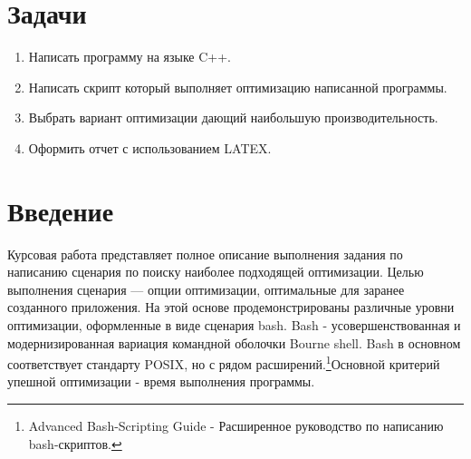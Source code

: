 \documentclass{article}
\begin{document}
\section{Задачи}
 \begin{enumerate}
    \item Написать программу на языке C++.
    \item Написать скрипт который выполняет оптимизацию написанной программы.
    \item Выбрать вариант оптимизации дающий наибольшую производительность.
    \item Оформить отчет с использованием LATEX.
  \end{enumerate}
  
\newpage 
\section{Введение}
\setlength{\parindent}{1.25cm}Курсовая работа представляет полное описание выполнения задания по написанию сценария по поиску наиболее подходящей оптимизации.
Целью выполнения сценария — опции оптимизации, оптимальные для заранее созданного приложения.
На этой основе продемонстрированы различные уровни оптимизации, оформленные в виде сценария bash. Bash  - усовершенствованная и модернизированная вариация командной оболочки Bourne shell. Bash в основном соответствует стандарту POSIX, но с рядом расширений.\footnote{Advanced Bash-Scripting Guide - Расширенное руководство по написанию bash-скриптов.}Основной критерий упешной оптимизации - время выполнения программы. \\
\newpage
\end{document}
